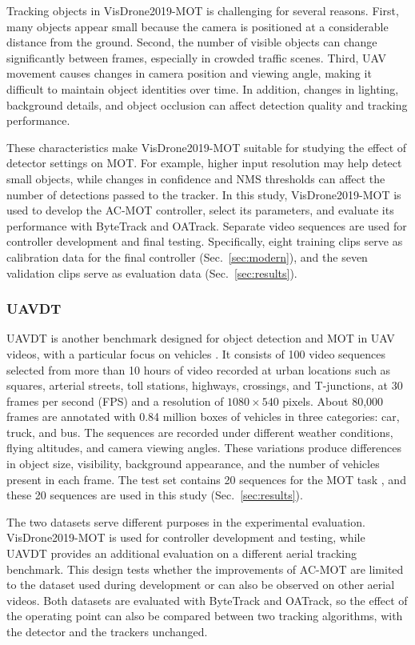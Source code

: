 \documentclass[journal]{new-aiaa}
\begin{document}
Tracking objects in VisDrone2019-MOT is challenging for several reasons. First, many objects appear small because the camera is positioned at a considerable distance from the ground. Second, the number of visible objects can change significantly between frames, especially in crowded traffic scenes. Third, UAV movement causes changes in camera position and viewing angle, making it difficult to maintain object identities over time. In addition, changes in lighting, background details, and object occlusion can affect detection quality and tracking performance.

These characteristics make VisDrone2019-MOT suitable for studying the effect of detector settings on MOT. For example, higher input resolution may help detect small objects, while changes in confidence and NMS thresholds can affect the number of detections passed to the tracker. In this study, VisDrone2019-MOT is used to develop the AC-MOT controller, select its parameters, and evaluate its performance with ByteTrack and OATrack. Separate video sequences are used for controller development and final testing. Specifically, eight training clips
serve as calibration data for the final controller (Sec.~\ref{sec:modern}),
and the seven validation clips serve as evaluation data
(Sec.~\ref{sec:results}).

\subsubsection{UAVDT}
UAVDT is another benchmark designed for object detection and MOT in UAV
videos, with a particular focus on vehicles \cite{du2018uavdt}.
It consists of 100 video sequences selected from more than 10 hours of video
recorded at urban locations such as squares, arterial streets, toll stations,
highways, crossings, and T-junctions, at 30 frames per second (FPS) and a resolution
of $1080\times540$ pixels. About 80,000 frames are annotated with 0.84 million
boxes of vehicles in three categories: car, truck, and bus. The sequences are
recorded under different weather conditions, flying altitudes, and camera
viewing angles. These variations produce differences in object size,
visibility, background appearance, and the number of vehicles present in each
frame. The test set contains 20 sequences for the MOT task
\cite{du2018uavdt}, and these 20 sequences are used in this study
(Sec.~\ref{sec:results}).

The two datasets serve different purposes in the experimental evaluation. VisDrone2019-MOT is used for controller development and testing, while UAVDT provides an additional evaluation on a different aerial tracking benchmark. This design tests whether the improvements of AC-MOT are limited to the dataset used during development or can also be observed on other aerial videos. Both datasets are evaluated with ByteTrack and OATrack, so the effect of the operating point can also be compared between two tracking algorithms, with the detector and the trackers unchanged.
\end{document}
